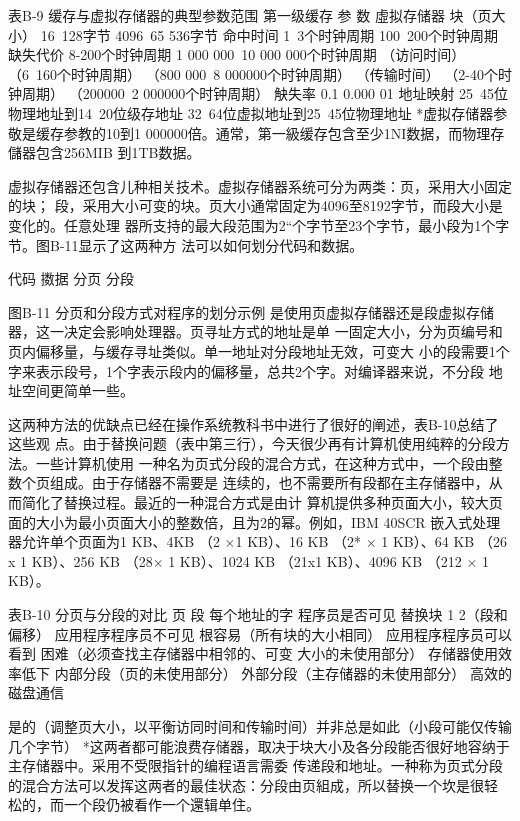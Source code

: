表B-9 缓存与虚拟存储器的典型参数范围
第一级缓存
参
数
虛拟存储器
块（页大小）
16~128字节
4096~65 536字节
命中时间
1~3个时钟周期
100~200个时钟周期
缺失代价
8-200个时钟周期
1 000 000~10 000 000个时钟周期
（访问时间）
（6~160个时钟周期）
（800 000~8 000000个时钟周期）
（传输时间）
（2-40个时钟周期）
（200000~2 000000个时钟周期）
觖失率
0.1%
0.000 01%
地址映射
25~45位物理地址到14~20位级存地址
32~64位虚拟地址到25~45位物理地址
*虚拟存储器参敬是缓存参教的10到1 000000倍。通常，第一級缓存包含至少1NI数据，而物理存儲器包含256MIB
到1TB数据。

虚拟存储器还包含儿种相关技术。虚拟存储器系统可分为两类：页，采用大小固定的块；
段，采用大小可变的块。页大小通常固定为4096至8192字节，而段大小是变化的。任意处理
器所支持的最大段范围为2“个字节至23个字节，最小段为1个字节。图B-11显示了这两种方
法可以如何划分代码和数据。

代码
擞据
分页
分段

图B-11 分页和分段方式对程序的划分示例
是使用页虚拟存储器还是段虚拟存储器，这一决定会影响处理器。页寻址方式的地址是单
一固定大小，分为页编号和页内偏移量，与缓存寻址类似。单一地址对分段地址无效，可变大
小的段需要1个字来表示段号，1个字表示段内的偏移量，总共2个字。对编译器来说，不分段
地址空间更简单一些。

这两种方法的优缺点已经在操作系统教科书中进行了很好的阐述，表B-10总结了这些观
点。由于替换问题（表中第三行），今天很少再有计算机使用纯粹的分段方法。一些计算机使用
一种名为页式分段的混合方式，在这种方式中，一个段由整数个页组成。由于存储器不需要是
连续的，也不需要所有段都在主存储器中，从而简化了替换过程。最近的一种混合方式是由计
算机提供多种页面大小，较大页面的大小为最小页面大小的整数倍，且为2的幂。例如，IBM
40SCR 嵌入式处理器允许单个页面为1 KB、4KB （2 ×1 KB）、16 KB （2* × 1 KB）、64 KB （26 x
1 KB）、256 KB （28× 1 KB）、1024 KB （21x1 KB）、4096 KB （212 × 1 KB）。

表B-10 分页与分段的对比
页
段
每个地址的字
程序员是否可见
替换块
1
2（段和偏移）
应用程序程序员不可见
根容易（所有块的大小相同）
应用程序程序员可以看到
困难（必须查找主存储器中相邻的、可变
大小的未使用部分）
存储器使用效率低下
内部分段（页的未使用部分）
外部分段（主存储器的未使用部分）
高效的磁盘通信

是的（调整页大小，以平衡访同时间和传输时间）并非总是如此（小段可能仅传输几个字节）
*这两者都可能浪费存储器，取决于块大小及各分段能否很好地容纳于主存储器中。采用不受限指针的编程语言需委
传递段和地址。一种称为页式分段的混合方法可以发挥这两者的最佳状态：分段由页組成，所以替换一个坎是很轻
松的，而一个段仍被看作一个還辑单住。

